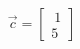 \documentclass[preview]{standalone}
\begin{document}
\begin{align*}
\vec{c} = \begin{bmatrix} \ 1 \\ 5 \end{bmatrix}
\end{align*}
\end{document}
